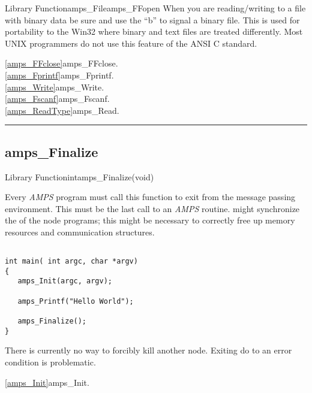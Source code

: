 \begin{deftypefn}{Library Function}{amps_File}{amps\_FFopen}
When you are reading/writing to a file with binary data be sure and
use the ``b'' to signal a binary file.  This is used for portability to
the Win32 where binary and text files are treated differently.  Most
UNIX programmers do not use this feature of the ANSI C standard.

\SEEALSO
\vref{amps_FFclose}{amps\_FFclose}. \\
\vref{amps_Fprintf}{amps\_Fprintf}. \\
\vref{amps_Write}{amps\_Write}. \\
\vref{amps_Fscanf}{amps\_Fscanf}. \\
\vref{amps_ReadType}{amps\_Read}. \\

\end{deftypefn}

\noindent\rule{\textwidth}{1mm}
\subsection{amps\_Finalize}
\label{amps_Finalize}


\begin{deftypefn}{Library Function}{int}{amps\_Finalize}(void)

\DESCRIPTION

Every {\em AMPS} program must call this function to exit from the
message passing environment.  This must be the last call to an
{\em AMPS} routine.   might synchronize the 
of the node programs;  this might be necessary to correctly free up
memory resources and communication structures.

\EXAMPLE

\begin{display}\begin{verbatim}

int main( int argc, char *argv)
{
   amps_Init(argc, argv);
   
   amps_Printf("Hello World");

   amps_Finalize();
}
\end{verbatim}\end{display}

\NOTES

There is currently no way to forcibly kill another node.  Exiting do
to an error condition is problematic.

\SEEALSO
\vref{amps_Init}{amps\_Init}. \\

\end{deftypefn}


